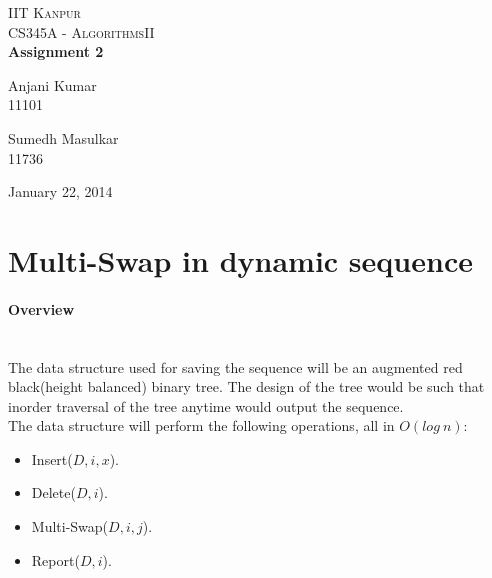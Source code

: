 \documentclass[pdftex,a4paper,12pt]{report}
\begin{document}
\begin{titlepage}
\begin{center}

\textsc{\LARGE IIT Kanpur}\\[1.5cm]

\textsc{\Large CS345A - AlgorithmsII}\\[0.5cm]

{ \huge \bfseries Assignment 2 \\[0.4cm] }


\begin{minipage}{0.4\textwidth}
\begin{flushleft} \large
Anjani Kumar\\
11101
\end{flushleft}
\end{minipage}
\begin{minipage}{0.4\textwidth}
\begin{flushright} \large
Sumedh Masulkar\\
11736
\end{flushright}
\end{minipage}

\vfill

{\large January 22, 2014}

\end{center}
\end{titlepage}

\tableofcontents
\newpage
\section{Multi-Swap in dynamic sequence}

\paragraph{Overview} \mbox{}\\

The data structure used for saving the sequence will be an augmented red black(height balanced) binary tree. 
The design of the tree would be such that inorder traversal of the tree anytime would output the sequence.\\

The data structure will perform the following operations, all in $O(log\ n)$:
\begin{itemize}
	\item Insert($D, i, x$).
	\item Delete($D, i$).
	\item Multi-Swap($D, i, j$).
	\item Report($D, i$).
\end{itemize}
\end{document}
